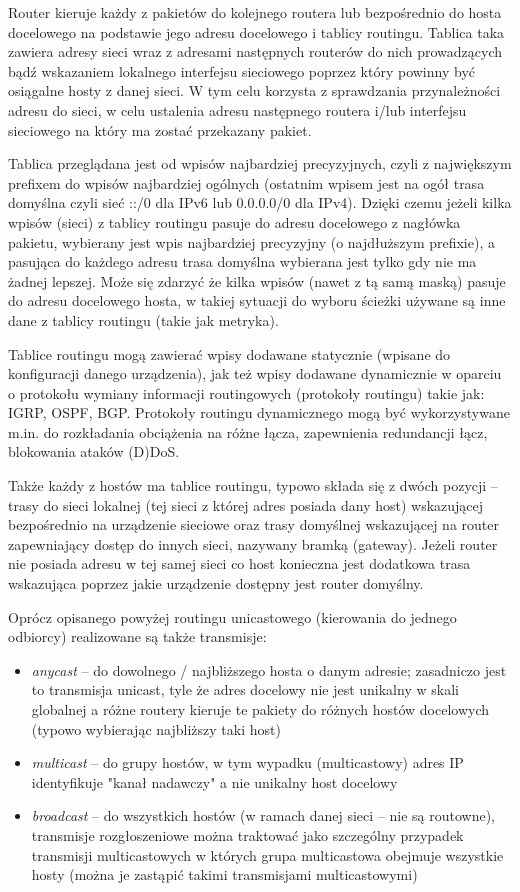 Router kieruje każdy z pakietów do kolejnego routera lub bezpośrednio do hosta docelowego na podstawie jego adresu docelowego i tablicy routingu. Tablica taka zawiera adresy sieci wraz z adresami następnych routerów do nich prowadzących bądź wskazaniem lokalnego interfejsu sieciowego poprzez który powinny być osiągalne hosty z danej sieci. W tym celu korzysta z sprawdzania przynależności adresu do sieci, w celu ustalenia adresu następnego routera i/lub interfejsu sieciowego na który ma zostać przekazany pakiet.

Tablica przeglądana jest od wpisów najbardziej precyzyjnych, czyli z największym prefixem do wpisów najbardziej ogólnych (ostatnim wpisem jest na ogół trasa domyślna czyli sieć ::/0 dla IPv6 lub 0.0.0.0/0 dla IPv4). Dzięki czemu jeżeli kilka wpisów (sieci) z tablicy routingu pasuje do adresu docelowego z nagłówka pakietu, wybierany jest wpis najbardziej precyzyjny (o najdłuższym prefixie), a pasująca do każdego adresu trasa domyślna wybierana jest tylko gdy nie ma żadnej lepszej. Może się zdarzyć że kilka wpisów (nawet z tą samą maską) pasuje do adresu docelowego hosta, w takiej sytuacji do wyboru ścieżki używane są inne dane z tablicy routingu (takie jak metryka).

Tablice routingu mogą zawierać wpisy dodawane statycznie (wpisane do konfiguracji danego urządzenia), jak też wpisy dodawane dynamicznie w oparciu o protokołu wymiany informacji routingowych (protokoły routingu) takie jak: IGRP, OSPF, BGP. Protokoły routingu dynamicznego mogą być wykorzystywane m.in. do rozkładania obciążenia na różne łącza, zapewnienia redundancji łącz, blokowania ataków (D)DoS.

Także każdy z hostów ma tablice routingu, typowo składa się z dwóch pozycji – trasy do sieci lokalnej (tej sieci z której adres posiada dany host) wskazującej bezpośrednio na urządzenie sieciowe oraz trasy domyślnej wskazującej na router zapewniający dostęp do innych sieci, nazywany bramką (gateway). Jeżeli router nie posiada adresu w tej samej sieci co host konieczna jest dodatkowa trasa wskazująca poprzez jakie urządzenie dostępny jest router domyślny.

Oprócz opisanego powyżej routingu unicastowego (kierowania do jednego odbiorcy) realizowane są także transmisje:
\begin{itemize}
	\item \emph{anycast} – do dowolnego / najbliższego hosta o danym adresie; zasadniczo jest to transmisja unicast, tyle że adres docelowy nie jest unikalny w skali globalnej a różne routery kieruje te pakiety do różnych hostów docelowych (typowo wybierając najbliższy taki host)
	\item \emph{multicast} – do grupy hostów, w tym wypadku (multicastowy) adres IP identyfikuje "kanał nadawczy" a nie unikalny host docelowy
	\item \emph{broadcast} – do wszystkich hostów (w ramach danej sieci – nie są routowne), transmisje rozgłoszeniowe można traktować jako szczególny przypadek transmisji multicastowych w których grupa multicastowa obejmuje wszystkie hosty (można je zastąpić takimi transmisjami multicastowymi)
\end{itemize}
